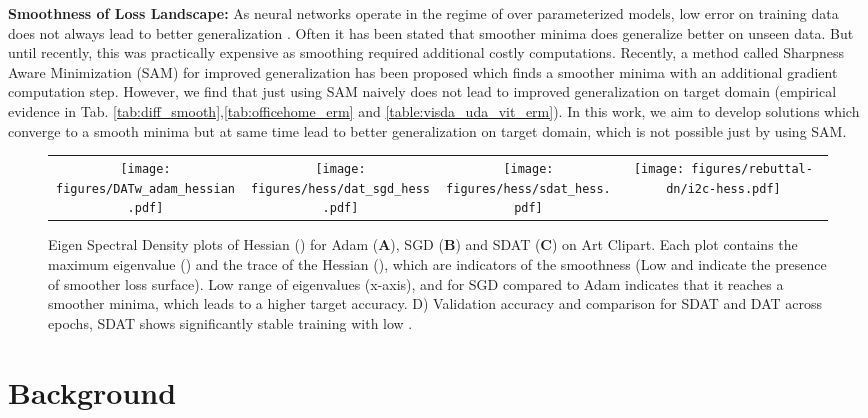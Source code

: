 \documentclass[table,dvipsnames]{article}
\theoremstyle{plain}
\theoremstyle{definition}
\theoremstyle{remark}
\begin{document}
{\textbf{Smoothness of Loss Landscape:} As neural networks operate in the regime of over parameterized models, low error on training data does not always lead to better generalization \citep{keskar2017large}. Often it has been stated \citep{hochreiter1997flat, hochreiter1994simplifying, he2019asymmetric, dziugaite2017computing}  that smoother minima does generalize better on unseen data. But until recently, this was practically expensive as smoothing required additional costly computations. Recently, a method called Sharpness Aware Minimization (SAM) \citep{foret2021sharpnessaware} for improved generalization has been proposed which finds a smoother minima with an additional gradient computation step. However, we find that just using SAM naively does not lead to improved generalization on target domain (empirical evidence in Tab. \ref{tab:diff_smooth},\ref{tab:officehome_erm} and \ref{table:visda_uda_vit_erm}). In this work, we aim to develop solutions which converge to a smooth minima but at same time lead to better generalization on target domain, which is not possible just by using SAM. }
\begin{figure*}[!t]
\centering
\begin{tabular}{c c c c}
\hspace{-0.4cm}\texttt{[image: figures/DATw\_adam\_hessian.pdf]} &   \hspace{-0.4cm}\texttt{[image: figures/hess/dat\_sgd\_hess.pdf]} &
\hspace{-0.4cm}\texttt{[image: figures/hess/sdat\_hess.pdf]} & \hspace{-0.4cm}\texttt{[image: figures/rebuttal-dn/i2c-hess.pdf]} \\
\end{tabular}
\caption{Eigen Spectral Density plots of Hessian () for Adam (\textbf{A}), SGD (\textbf{B}) and SDAT (\textbf{C}) on Art  Clipart. Each plot contains the maximum eigenvalue () and the trace of the Hessian (), which are indicators of the smoothness (Low  and  indicate the presence of smoother loss surface). Low range of eigenvalues (x-axis),  and  for SGD compared to Adam indicates that it reaches a smoother minima, which leads to a higher target accuracy. D) Validation accuracy and  comparison for SDAT and DAT across epochs, SDAT shows significantly stable training with low . }
\label{fig:hessian}
\end{figure*}
\section{Background}
\end{document}
